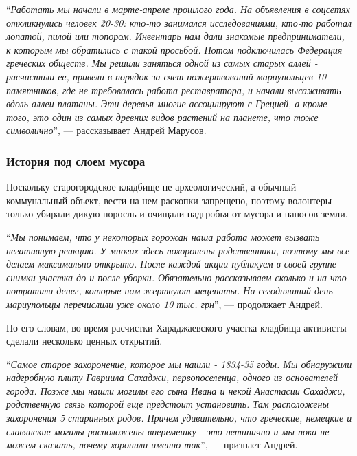 \enquote{\em Работать мы начали в марте-апреле прошлого года. На объявления в соцсетях
откликнулись человек 20-30: кто-то занимался исследованиями, кто-то работал
лопатой, пилой или топором. Инвентарь нам дали знакомые предприниматели, к
которым мы обратились с такой просьбой. Потом подключилась Федерация греческих
обществ. Мы решили заняться одной из самых старых аллей - расчистили ее,
привели в порядок за счет пожертвований мариупольцев 10 памятников, где не
требовалась работа реставратора, и начали высаживать вдоль аллеи платаны. Эти
деревья многие ассоциируют с Грецией, а кроме того, это один из самых древних
видов растений на планете, что тоже символично}, — рассказывает Андрей Марусов.


\subsubsection{История под слоем мусора}

Поскольку старогородское кладбище не археологический, а обычный коммунальный
объект, вести на нем раскопки запрещено, поэтому волонтеры только убирали дикую
поросль и очищали надгробья от мусора и наносов земли. 

\enquote{\em Мы понимаем, что у некоторых горожан наша работа может вызвать негативную
реакцию. У многих здесь похоронены родственники, поэтому мы все делаем
максимально открыто. После каждой акции публикуем в своей группе снимки участка
до и после уборки. Обязательно рассказываем сколько и на что потратили денег,
которые нам жертвуют меценаты. На сегодняшний день мариупольцы перечислили уже
около 10 тыс. грн}, — продолжает Андрей.


По его словам, во время расчистки Хараджаевского участка кладбища активисты
сделали несколько ценных открытий.

\enquote{\em Самое старое захоронение, которое мы нашли - 1834-35 годы. Мы обнаружили
надгробную плиту Гавриила Сахаджи, первопоселенца, одного из основателей
города. Позже мы нашли могилы его сына Ивана и некой Анастасии Сахаджи,
родственную связь которой еще предстоит установить. Там расположены захоронения
5 старинных родов. Причем удивительно, что греческие, немецкие и славянские
могилы расположены вперемешку - это нетипично и мы пока не можем сказать,
почему хоронили именно так}, — признает Андрей.

